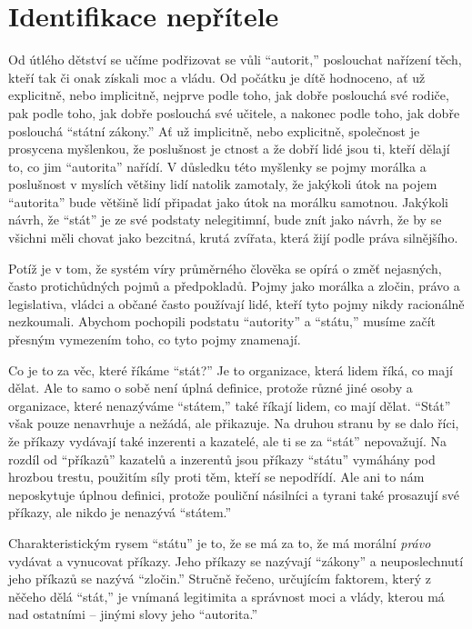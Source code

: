 \documentclass{book}
\begin{document}
\section{Identifikace nepřítele}

Od útlého dětství se učíme podřizovat se vůli \enquote{autorit,} poslouchat nařízení těch, kteří tak či onak získali moc a vládu. Od počátku je dítě hodnoceno, ať už explicitně, nebo implicitně, nejprve podle toho, jak dobře poslouchá své rodiče, pak podle toho, jak dobře poslouchá své učitele, a nakonec podle toho, jak dobře poslouchá \enquote{státní zákony.} Ať už implicitně, nebo explicitně, společnost je prosycena myšlenkou, že poslušnost je ctnost a že dobří lidé jsou ti, kteří dělají to, co jim \enquote{autorita} nařídí. V důsledku této myšlenky se pojmy morálka a poslušnost v myslích většiny lidí natolik zamotaly, že jakýkoli útok na pojem \enquote{autorita} bude většině lidí připadat jako útok na morálku samotnou. Jakýkoli návrh, že \enquote{stát} je ze své podstaty nelegitimní, bude znít jako návrh, že by se všichni měli chovat jako bezcitná, krutá zvířata, která žijí podle práva silnějšího.

Potíž je v tom, že systém víry průměrného člověka se opírá o změť nejasných, často protichůdných pojmů a předpokladů. Pojmy jako morálka a zločin, právo a legislativa, vládci a občané často používají lidé, kteří tyto pojmy nikdy racionálně nezkoumali. Abychom pochopili podstatu \enquote{autority} a \enquote{státu,} musíme začít přesným vymezením toho, co tyto pojmy znamenají.

Co je to za věc, které říkáme \enquote{stát?} Je to organizace, která lidem říká, co mají dělat. Ale to samo o sobě není úplná definice, protože různé jiné osoby a organizace, které nenazýváme \enquote{státem,} také říkají lidem, co mají dělat. \enquote{Stát} však pouze nenavrhuje a nežádá, ale přikazuje. Na druhou stranu by se dalo říci, že příkazy vydávají také inzerenti a kazatelé, ale ti se za \enquote{stát} nepovažují. Na rozdíl od \enquote{příkazů} kazatelů a inzerentů jsou příkazy \enquote{státu} vymáhány pod hrozbou trestu, použitím síly proti těm, kteří se nepodřídí. Ale ani to nám neposkytuje úplnou definici, protože pouliční násilníci a tyrani také prosazují své příkazy, ale nikdo je nenazývá \enquote{státem.}

Charakteristickým rysem \enquote{státu} je to, že se má za to, že má morální \emph{právo} vydávat a vynucovat příkazy. Jeho příkazy se nazývají \enquote{zákony} a neuposlechnutí jeho příkazů se nazývá \enquote{zločin.} Stručně řečeno, určujícím faktorem, který z něčeho dělá \enquote{stát,} je vnímaná legitimita a správnost moci a vlády, kterou má nad ostatními -- jinými slovy jeho \enquote{autorita.}
\end{document}
